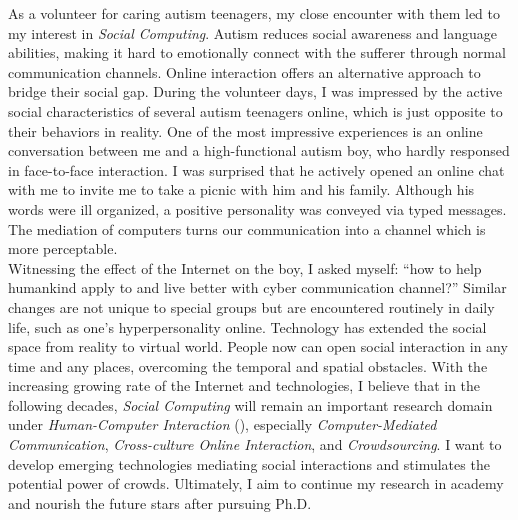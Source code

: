 As a volunteer for caring autism teenagers, my close encounter with them led to my interest in \textit{Social Computing}. 
Autism reduces social awareness and language abilities, 
making it hard to emotionally connect with the sufferer through normal communication channels.
Online interaction offers an alternative approach to bridge their social gap.
During the volunteer days, I was impressed by the active social characteristics of several autism teenagers online,
which is just opposite to their behaviors in reality.
One of the most impressive experiences is an online conversation between me and a high-functional autism boy,
who hardly responsed in face-to-face interaction.
I was surprised that he actively opened an online chat with me to invite me to take a picnic with him and his family.
Although his words were ill organized, a positive personality was conveyed via typed messages.
The mediation of computers turns our communication into a channel which is more perceptable.\\

\noindent
Witnessing the effect of the Internet on the boy, I asked myself:
``how to help humankind apply to and live better with cyber communication channel?''
Similar changes are not unique to special groups but are encountered routinely in daily life,
such as one's hyperpersonality online.
Technology has extended the social space from reality to virtual world.
People now can open social interaction in any time and any places, overcoming the temporal and spatial obstacles.
With the increasing growing rate of the Internet and technologies, I believe that in the following decades, 
\textit{Social Computing} will remain an important research domain under \textit{Human-Computer Interaction} (),
especially \textit{Computer-Mediated Communication}, \textit{Cross-culture Online Interaction}, and \textit{Crowdsourcing}.
I want to develop emerging technologies mediating social interactions and stimulates the potential power of crowds. 
Ultimately, I aim to continue my research in academy and nourish the future stars after pursuing Ph.D.\\




